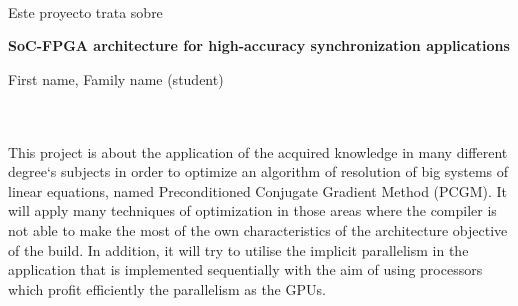 \chapter*{}






\cleardoublepage
\thispagestyle{empty}

\begin{center}
{\large\bfseries \myTitle}\\
\end{center}
\begin{center}
\myName\\
\end{center}

\\

\vspace{0.7cm}
\\

Este proyecto trata sobre 

\cleardoublepage


\thispagestyle{empty}


\begin{center}
{\large\bfseries SoC-FPGA architecture for high-accuracy synchronization 
applications}\\
\end{center}
\begin{center}
First name, Family name (student)\\
\end{center}

\\

\vspace{0.7cm}
\\

This project is about the application of the acquired knowledge in many different degree`s subjects in order to optimize an algorithm of resolution of big systems of linear equations, named Preconditioned Conjugate Gradient Method (PCGM). It will apply many techniques of optimization in those areas where the compiler is not able to make the most of the own characteristics of the architecture objective of the build. In addition, it will try to utilise the implicit parallelism in the application that is implemented sequentially with the aim of using processors which profit efficiently the parallelism as the GPUs.

